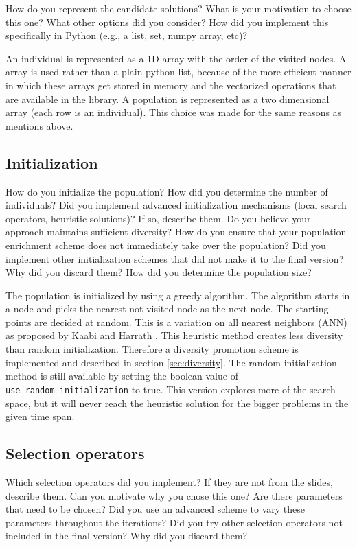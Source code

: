\documentclass[a4paper,10pt]{article}
\newcommand{\ReplaceMe}[1]{{\color{blue}#1}}
\begin{document}
\ReplaceMe{How do you represent the candidate solutions? What is your motivation to choose this one? What other options did you consider? How did you implement this specifically in Python (e.g., a list, set, numpy array, etc)?}

An individual is represented as a 1D  array with the order of the visited nodes. A  array is used rather than a plain python list, because of the more efficient manner in which these arrays get stored in memory and the vectorized operations that are available in the  library. A population is represented as a two dimensional array (each row is an individual). This choice was made for the same reasons as mentions above.

\subsection{Initialization}

\ReplaceMe{How do you initialize the population? How did you determine the number of individuals? Did you implement advanced initialization mechanisms (local search operators, heuristic solutions)? If so, describe them. Do you believe your approach maintains sufficient diversity? How do you ensure that your population enrichment scheme does not immediately take over the population? Did you implement other initialization schemes that did not make it to the final version? Why did you discard them? How did you determine the population size?}

The population is initialized by using a greedy algorithm. The algorithm starts in a node and picks the nearest not visited node as the next node. The starting points are decided at random. This is a variation on all nearest neighbors (ANN) as proposed by Kaabi and Harrath \cite{ann}. This heuristic method creates less diversity than random initialization. Therefore a diversity promotion scheme is implemented and described in section \ref{sec:diversity}. The random initialization method is still available by setting the boolean value of \texttt{use\_random\_initialization} to true. This version explores more of the search space, but it will never reach the heuristic solution for the bigger problems in the given time span.

\subsection{Selection operators}

\ReplaceMe{Which selection operators did you implement? If they are not from the slides, describe them. Can you motivate why you chose this one? Are there parameters that need to be chosen? Did you use an advanced scheme to vary these parameters throughout the iterations? Did you try other selection operators not included in the final version? Why did you discard them?}
\end{document}
